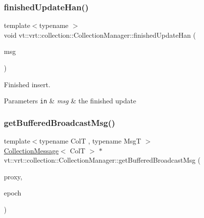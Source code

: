 \subsubsection{\texorpdfstring{finished\+Update\+Han()}{finishedUpdateHan()}}
{\footnotesize\ttfamily template$<$typename $>$ \\
void vt\+::vrt\+::collection\+::\+Collection\+Manager\+::finished\+Update\+Han (\begin{DoxyParamCaption}\item[{\hyperlink{structvt_1_1vrt_1_1collection_1_1_finished_update_msg}{Finished\+Update\+Msg} $\ast$}]{msg }\end{DoxyParamCaption})\hspace{0.3cm}{\ttfamily [static]}}



Finished insert. 


\begin{DoxyParams}[1]{Parameters}
\mbox{\tt in}  & {\em msg} & the finished update \\
\hline
\end{DoxyParams}
\mbox{\label{structvt_1_1vrt_1_1collection_1_1_collection_manager_a8c992f2c417d5d44b8b8a603d21920de}} 
\subsubsection{\texorpdfstring{get\+Buffered\+Broadcast\+Msg()}{getBufferedBroadcastMsg()}}
{\footnotesize\ttfamily template$<$typename ColT , typename MsgT $>$ \\
\hyperlink{structvt_1_1vrt_1_1collection_1_1_collection_message}{Collection\+Message}$<$ ColT $>$ $\ast$ vt\+::vrt\+::collection\+::\+Collection\+Manager\+::get\+Buffered\+Broadcast\+Msg (\begin{DoxyParamCaption}\item[{\hyperlink{namespacevt_a1b417dd5d684f045bb58a0ede70045ac}{Virtual\+Proxy\+Type} const \&}]{proxy,  }\item[{\hyperlink{namespacevt_a985a5adf291c34a3ca263b3378388236}{Epoch\+Type} const \&}]{epoch }\end{DoxyParamCaption})\hspace{0.3cm}{\ttfamily [private]}}



